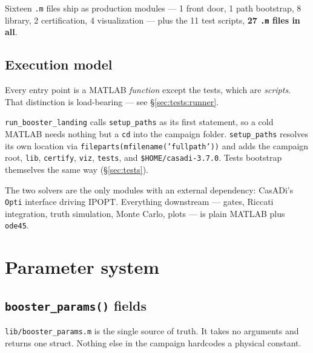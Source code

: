 \documentclass[11pt]{article}
\newcommand{\file}[1]{\texttt{#1}}
\begin{document}
Sixteen \texttt{.m} files ship as production modules --- 1 front door,
1 path bootstrap, 8 library, 2 certification, 4 visualization --- plus the
11 test scripts, \textbf{27 \texttt{.m} files in all}.

\subsection{Execution model}

Every entry point is a MATLAB \emph{function} except the tests, which are
\emph{scripts}. That distinction is load-bearing --- see
\S\ref{sec:tests:runner}.

\file{run\_booster\_landing} calls \file{setup\_paths} as its first
statement, so a cold MATLAB needs nothing but a \texttt{cd} into the
campaign folder. \file{setup\_paths} resolves its own location via
\texttt{fileparts(mfilename('fullpath'))} and adds the campaign root,
\file{lib}, \file{certify}, \file{viz}, \file{tests}, and
\verb|$HOME/casadi-3.7.0|. Tests bootstrap themselves the same way
(\S\ref{sec:tests}).

The two solvers are the only modules with an external dependency: CasADi's
\texttt{Opti} interface driving IPOPT. Everything downstream --- gates,
Riccati integration, truth simulation, Monte Carlo, plots --- is plain
MATLAB plus \texttt{ode45}.

\section{Parameter system}
\label{sec:params}

\subsection{\texttt{booster\_params()} fields}

\file{lib/booster\_params.m} is the single source of truth. It takes no
arguments and returns one struct. Nothing else in the campaign hardcodes a
physical constant.
\end{document}
